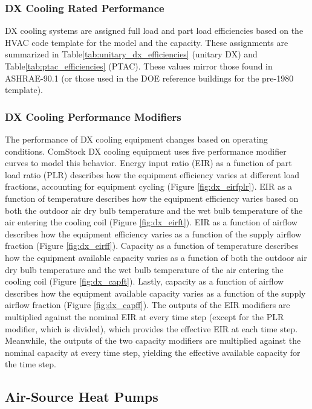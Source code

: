 \subsubsection{DX Cooling Rated Performance}

DX cooling systems are assigned full load and part load efficiencies based on the HVAC code template for the model and the capacity. These assignments are summarized in Table\ref{tab:unitary_dx_efficiencies} (unitary DX) and Table\ref{tab:ptac_efficiencies} (PTAC). These values mirror those found in ASHRAE-90.1 (or those used in the DOE reference buildings for the pre-1980 template).


\subsubsection{DX Cooling Performance Modifiers}

The performance of DX cooling equipment changes based on operating conditions. ComStock DX cooling equipment uses five performance modifier curves to model this behavior. Energy input ratio (EIR) as a function of part load ratio (PLR) describes how the equipment efficiency varies at different load fractions, accounting for equipment cycling (Figure  \ref{fig:dx_eirfplr}). EIR as a function of temperature describes how the equipment efficiency varies based on both the outdoor air dry bulb temperature and the wet bulb temperature of the air entering the cooling coil (Figure \ref{fig:dx_eirft}). EIR as a function of airflow describes how the equipment efficiency varies as a function of the supply airflow fraction (Figure \ref{fig:dx_eirff}). Capacity as a function of temperature describes how the equipment available capacity varies as a function of both the outdoor air dry bulb temperature and the wet bulb temperature of the air entering the cooling coil (Figure \ref{fig:dx_capft}). Lastly, capacity as a function of airflow describes how the equipment available capacity varies as a function of the supply airflow fraction (Figure \ref{fig:dx_capff}). The outputs of the EIR modifiers are multiplied against the nominal EIR at every time step (except for the PLR modifier, which is divided), which provides the effective EIR at each time step. Meanwhile, the outputs of the two capacity modifiers are multiplied against the nominal capacity at every time step, yielding the effective available capacity for the time step.


\subsection{Air-Source Heat Pumps}

